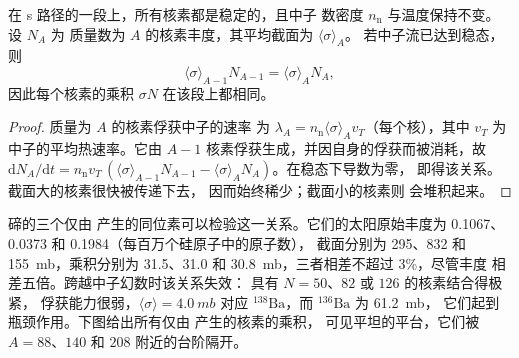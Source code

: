 \begin{proposition}[$\sigma N$ 关系]\label{prop:b3:origin-of-elements:sigma-n}
在 s 路径的一段上，所有核素都是稳定的，且中子
数密度 $n_\mathrm{n}$ 与温度保持不变。设 $N_A$ 为
质量数为 $A$ 的核素丰度，其平均截面为 $\langle\sigma\rangle_A$。
若中子流已达到稳态，
则
\[
\langle\sigma\rangle_{A-1} N_{A-1} = \langle\sigma\rangle_A N_A ,
\]
因此每个核素的乘积 $\sigma N$
在该段上都相同。
\end{proposition}

\begin{proof}
质量为 $A$ 的核素俘获中子的速率
为 $\lambda_A = n_\mathrm{n}\langle\sigma\rangle_A v_T$（每个核），其中
$v_T$ 为中子的平均热速率。它由
$A - 1$ 核素俘获生成，并因自身的俘获而被消耗，故
$\mathrm{d}N_A/\mathrm{d}t = n_\mathrm{n} v_T\,(\langle\sigma\rangle_{A-1}
N_{A-1} - \langle\sigma\rangle_A N_A)$。在稳态下导数为零，
即得该关系。截面大的核素很快被传递下去，
因而始终稀少；截面小的核素则
会堆积起来。
\end{proof}

碲的三个仅由 产生的同位素可以检验这一关系。它们的太阳原始丰度为
\num{0.1067}、\num{0.0373} 和 \num{0.1984}（每百万个硅原子中的原子数），
截面分别为 \num{295}、\num{832} 和
\qty{155}{mb}，乘积分别为 \num{31.5}、\num{31.0} 和
\qty{30.8}{mb}，三者相差不超过 3\%，尽管丰度
相差五倍。跨越中子幻数时该关系失效：
具有 $N = 50$、$82$ 或 $126$ 的核素结合得极紧，
俘获能力很弱，$\langle\sigma\rangle = \qty{4.0}{mb}$ 对应
$^{138}\mathrm{Ba}$，而 $^{136}\mathrm{Ba}$ 为 \qty{61.2}{mb}，
它们起到瓶颈作用。下图给出所有仅由 产生的核素的乘积，
可见平坦的平台，它们被 $A = 88$、$140$
和 $208$ 附近的台阶隔开。

